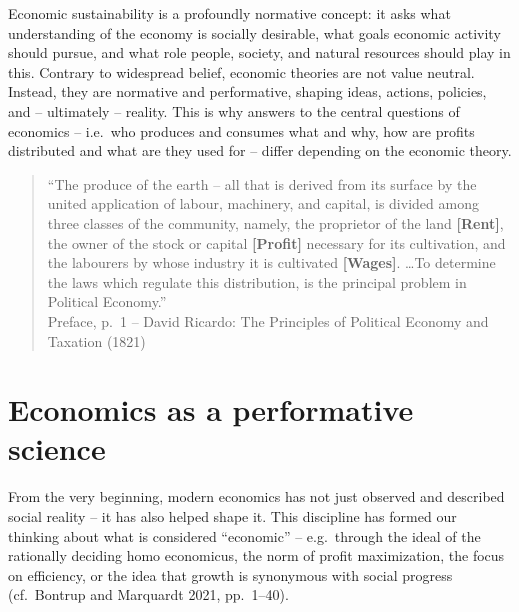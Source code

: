 \documentclass[
  a4paper,
  openany]{book}
\begin{document}
Economic sustainability is a profoundly normative concept: it asks what
understanding of the economy is socially desirable, what goals economic
activity should pursue, and what role people, society, and natural
resources should play in this. Contrary to widespread belief, economic
theories are not value neutral. Instead, they are normative and
performative, shaping ideas, actions, policies, and -- ultimately --
reality. This is why answers to the central questions of economics --
i.e.~who produces and consumes what and why, how are profits distributed
and what are they used for -- differ depending on the economic theory.

\begin{tcolorbox}[enhanced jigsaw, left=2mm, arc=.35mm, titlerule=0mm, opacityback=0, leftrule=.75mm, title={Defining rent, profit, and wages}, breakable, bottomtitle=1mm, rightrule=.15mm, coltitle=black, toptitle=1mm, bottomrule=.15mm, colback=white, opacitybacktitle=0.6, colbacktitle=quarto-callout-note-color!10!white, toprule=.15mm, colframe=quarto-callout-note-color-frame]

\begin{quote}
``The produce of the earth -- all that is derived from its surface by
the united application of labour, machinery, and capital, is divided
among three classes of the community, namely, the proprietor of the land
\textbf{{[}Rent{]}}, the owner of the stock or capital
\textbf{{[}Profit{]}} necessary for its cultivation, and the labourers
by whose industry it is cultivated \textbf{{[}Wages{]}}. \ldots To
determine the laws which regulate this distribution, is the principal
problem in Political Economy.''\\
Preface, p.~1 -- David Ricardo: The Principles of Political Economy and
Taxation (1821)
\end{quote}

\end{tcolorbox}

\section{Economics as a performative
science}\label{economics-as-a-performative-science}

From the very beginning, modern economics has not just observed and
described social reality -- it has also helped shape it. This discipline
has formed our thinking about what is considered ``economic'' --
e.g.~through the ideal of the rationally deciding homo economicus, the
norm of profit maximization, the focus on efficiency, or the idea that
growth is synonymous with social progress (cf.~Bontrup and Marquardt
2021, pp.~1--40).
\end{document}
